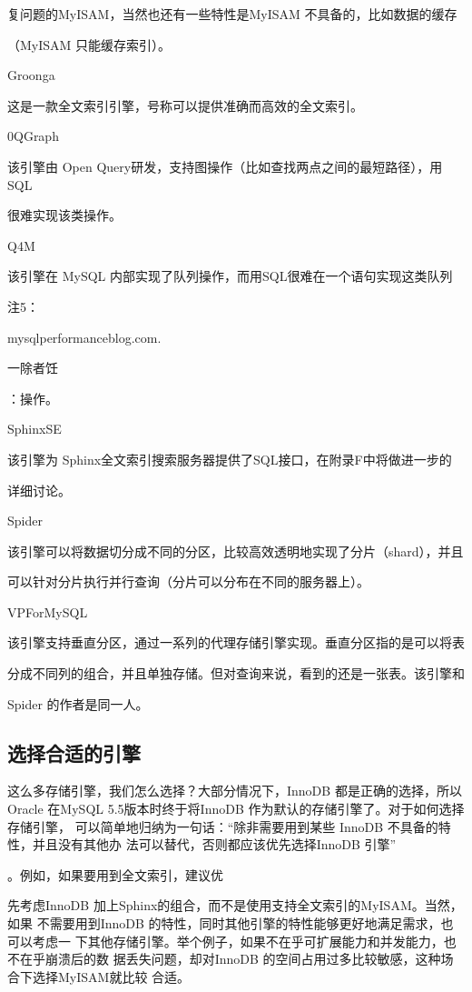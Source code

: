 复问题的MyISAM，当然也还有一些特性是MyISAM 不具备的，比如数据的缓存

（MyISAM 只能缓存索引）。

Groonga

这是一款全文索引引擎，号称可以提供准确而高效的全文索引。

0QGraph

该引擎由 Open Query研发，支持图操作（比如查找两点之间的最短路径），用SQL

很难实现该类操作。

Q4M

该引擎在 MySQL 内部实现了队列操作，而用SQL很难在一个语句实现这类队列

注5：

mysqlperformanceblog.com.

一除者饪

：操作。

SphinxSE

该引擎为 Sphinx全文索引搜索服务器提供了SQL接口，在附录F中将做进一步的

详细讨论。

Spider

该引擎可以将数据切分成不同的分区，比较高效透明地实现了分片（shard），并且

可以针对分片执行并行查询（分片可以分布在不同的服务器上）。

VPForMySQL

该引擎支持垂直分区，通过一系列的代理存储引擎实现。垂直分区指的是可以将表

分成不同列的组合，并且单独存储。但对查询来说，看到的还是一张表。该引擎和

Spider 的作者是同一人。

\subsection{选择合适的引擎}
这么多存储引擎，我们怎么选择？大部分情况下，InnoDB 都是正确的选择，所以 Oracle
在MySQL 5.5版本时终于将InnoDB 作为默认的存储引擎了。对于如何选择存储引擎，
可以简单地归纳为一句话：“除非需要用到某些 InnoDB 不具备的特性，并且没有其他办
法可以替代，否则都应该优先选择InnoDB 引擎”

。例如，如果要用到全文索引，建议优

先考虑InnoDB 加上Sphinx的组合，而不是使用支持全文索引的MyISAM。当然，如果
不需要用到InnoDB 的特性，同时其他引擎的特性能够更好地满足需求，也可以考虑一
下其他存储引擎。举个例子，如果不在乎可扩展能力和并发能力，也不在乎崩溃后的数
据丢失问题，却对InnoDB 的空间占用过多比较敏感，这种场合下选择MyISAM就比较
合适。

